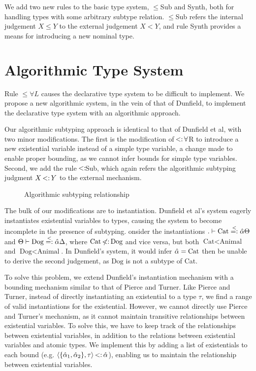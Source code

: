 \documentclass{sig-alternate}
\begin{document}
We add two new rules to the basic type system, $\leq$Sub and Synth, both for handling types with some arbitrary subtype relation. $\leq$Sub refers the internal judgement $X \leq Y$ to the external judgement $X < Y$, and rule Synth provides a means for introducing a new nominal type.

\section{Algorithmic Type System}
Rule $\leq\forall L$ causes the declarative type system to be difficult to implement. We propose a new algorithmic system, in the vein of that of Dunfield, to implement the declarative type system with an algorithmic approach.

Our algorithmic subtyping approach is identical to that of Dunfield et al, with two minor modifications. The first is the modification of $\st\forall$R to introduce a new existential variable instead of a simple type variable, a change made to enable proper bounding, as we cannot infer bounds for simple type variables. Second, we add the rule $\st$Sub, which again refers the algorithmic subtyping judgment $X \st Y$ to the external mechanism.

\begin{figure}

\small

\caption{Algorithmic subtyping relationship}
\end{figure}

The bulk of our modifications are to instantiation. Dunfield et al's system eagerly instantiates existential variables to types, causing the system to become incomplete in the presence of subtyping. onsider the instantiations $. \vdash \text{Cat} \overset{<}{=:} \hat{\alpha} \Theta$ and $\Theta \vdash \text{Dog} \overset{<}{=:} \hat{\alpha} \Delta$, where $\text{Cat} \not\st \text{Dog}$ and vice versa, but both $\text{Cat} < \text{Animal}$ and $\text{Dog} < \text{Animal}$. In Dunfield's system, it would infer $\hat{\alpha} = \text{Cat}$ then be unable to derive the second judgement, as $\text{Dog}$ is not a subtype of Cat.

To solve this problem, we extend Dunfield's instantiation mechanism with a bounding mechanism similar to that of Pierce and Turner. Like Pierce and Turner, instead of directly instantiating an existential to a type $\tau$, we find a range of valid instantiations for the existential. However, we cannot directly use Pierce and Turner's mechanism, as it cannot maintain transitive relationships between existential variables. To solve this, we have to keep track of the relationships between existential variables, in addition to the relations between existential variables and atomic types. We implement this by adding a list of existentials to each bound (e.g. $\pair{\{\alphahat_1,\alphahat_2\}}{\tau} \st \alphahat$), enabling us to maintain the relationship between existential variables.
\end{document}
